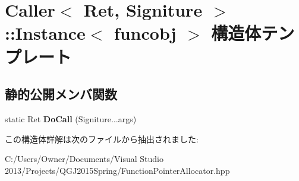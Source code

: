 \hypertarget{struct_caller_1_1_instance}{}\section{Caller$<$ Ret, Signiture $>$\+:\+:Instance$<$ funcobj $>$ 構造体テンプレート}
\label{struct_caller_1_1_instance}
\subsection*{静的公開メンバ関数}
\begin{DoxyCompactItemize}
\item 
static Ret {\bfseries Do\+Call} (Signiture...\+args)\hypertarget{struct_caller_1_1_instance_ab607bf067442952feb4807e1c59e996d}{}\label{struct_caller_1_1_instance_ab607bf067442952feb4807e1c59e996d}

\end{DoxyCompactItemize}


この構造体詳解は次のファイルから抽出されました\+:\begin{DoxyCompactItemize}
\item 
C\+:/\+Users/\+Owner/\+Documents/\+Visual Studio 2013/\+Projects/\+Q\+G\+J2015\+Spring/Function\+Pointer\+Allocator.\+hpp\end{DoxyCompactItemize}
